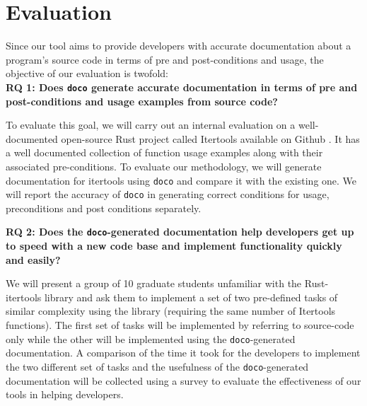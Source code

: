 \section{Evaluation}

Since our tool aims to provide developers with accurate documentation about a program's source code in terms of pre and post-conditions and usage, the objective of our evaluation is twofold:\\
\newline
{\bf RQ 1: Does \texttt{doco} generate accurate documentation in terms of pre and post-conditions and usage examples from source code?}

To evaluate this goal, we will carry out an internal evaluation on a well-documented open-source Rust project called Itertools available on Github \cite{bluss:2018}. It has a well documented collection of function usage examples along with their associated pre-conditions. To evaluate our methodology, we will generate documentation for itertools using \texttt{doco} and compare it with the existing one. We will report the accuracy of \texttt{doco} in generating correct conditions for usage, preconditions and post conditions separately.\newline

{\bf RQ 2: Does the \texttt{doco}-generated documentation help developers get up to speed with a new code base and implement functionality quickly and easily?}

We will present a group of 10 graduate students unfamiliar with the Rust-itertools library and ask them to implement a set of two pre-defined tasks of similar complexity using the library  (requiring the same number of Itertools functions). The first set of tasks will be implemented by referring to source-code only while the other will be implemented using the \texttt{doco}-generated documentation. A comparison of the time it took for the developers to implement the two different set of tasks and the usefulness of the \texttt{doco}-generated documentation will be collected using a survey to evaluate the effectiveness of our tools in helping developers.
